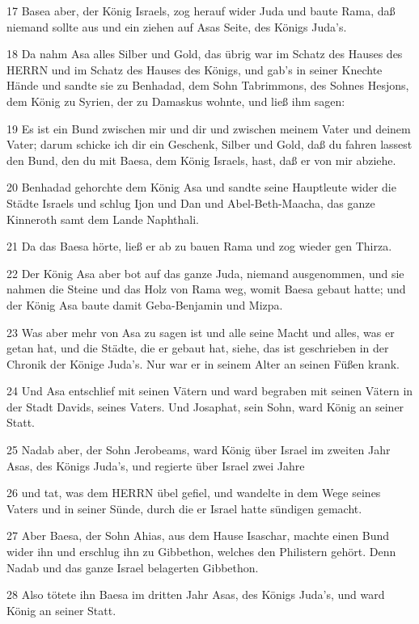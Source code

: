 \par 17 Basea aber, der König Israels, zog herauf wider Juda und baute Rama, daß niemand sollte aus und ein ziehen auf Asas Seite, des Königs Juda's.
\par 18 Da nahm Asa alles Silber und Gold, das übrig war im Schatz des Hauses des HERRN und im Schatz des Hauses des Königs, und gab's in seiner Knechte Hände und sandte sie zu Benhadad, dem Sohn Tabrimmons, des Sohnes Hesjons, dem König zu Syrien, der zu Damaskus wohnte, und ließ ihm sagen:
\par 19 Es ist ein Bund zwischen mir und dir und zwischen meinem Vater und deinem Vater; darum schicke ich dir ein Geschenk, Silber und Gold, daß du fahren lassest den Bund, den du mit Baesa, dem König Israels, hast, daß er von mir abziehe.
\par 20 Benhadad gehorchte dem König Asa und sandte seine Hauptleute wider die Städte Israels und schlug Ijon und Dan und Abel-Beth-Maacha, das ganze Kinneroth samt dem Lande Naphthali.
\par 21 Da das Baesa hörte, ließ er ab zu bauen Rama und zog wieder gen Thirza.
\par 22 Der König Asa aber bot auf das ganze Juda, niemand ausgenommen, und sie nahmen die Steine und das Holz von Rama weg, womit Baesa gebaut hatte; und der König Asa baute damit Geba-Benjamin und Mizpa.
\par 23 Was aber mehr von Asa zu sagen ist und alle seine Macht und alles, was er getan hat, und die Städte, die er gebaut hat, siehe, das ist geschrieben in der Chronik der Könige Juda's. Nur war er in seinem Alter an seinen Füßen krank.
\par 24 Und Asa entschlief mit seinen Vätern und ward begraben mit seinen Vätern in der Stadt Davids, seines Vaters. Und Josaphat, sein Sohn, ward König an seiner Statt.
\par 25 Nadab aber, der Sohn Jerobeams, ward König über Israel im zweiten Jahr Asas, des Königs Juda's, und regierte über Israel zwei Jahre
\par 26 und tat, was dem HERRN übel gefiel, und wandelte in dem Wege seines Vaters und in seiner Sünde, durch die er Israel hatte sündigen gemacht.
\par 27 Aber Baesa, der Sohn Ahias, aus dem Hause Isaschar, machte einen Bund wider ihn und erschlug ihn zu Gibbethon, welches den Philistern gehört. Denn Nadab und das ganze Israel belagerten Gibbethon.
\par 28 Also tötete ihn Baesa im dritten Jahr Asas, des Königs Juda's, und ward König an seiner Statt.
